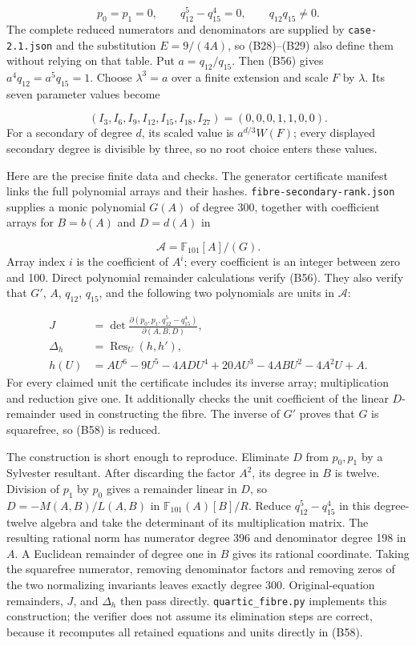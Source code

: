 \documentclass[
]{article}
\begin{document}
\[
p_0=p_1=0,\qquad q_{12}^5-q_{15}^4=0,\qquad q_{12}q_{15}\ne0.
\tag{B56}
\] The complete reduced numerators and denominators are supplied by
\texttt{case-2.1.json} and the substitution \(E=9/(4A)\), so
(B28)--(B29) also define them without relying on that table. Put
\(a=q_{12}/q_{15}\). Then (B56) gives \(a^4q_{12}=a^5q_{15}=1\). Choose
\(\lambda^3=a\) over a finite extension and scale \(F\) by \(\lambda\).
Its seven parameter values become
\protect{}\label{equation-B57}{}

\[
(I_3,I_6,I_9,I_{12},I_{15},I_{18},I_{27})=(0,0,0,1,1,0,0).
\tag{B57}
\] For a secondary of degree \(d\), its scaled value is \(a^{d/3}W(F)\);
every displayed secondary degree is divisible by three, so no root
choice enters these values.

Here are the precise finite data and checks. The generator certificate
manifest links the full polynomial arrays and their hashes.
\texttt{fibre-secondary-rank.json} supplies a monic polynomial \(G(A)\)
of degree 300, together with coefficient arrays for \(B=b(A)\) and
\(D=d(A)\) in \protect{}\label{equation-B58}{}

\[
\mathcal A=\mathbb F_{101}[A]/(G).
\tag{B58}
\] Array index \(i\) is the coefficient of \(A^i\); every coefficient is
an integer between zero and 100. Direct polynomial remainder
calculations verify (B56). They also verify that \(G'\), \(A\),
\(q_{12}\), \(q_{15}\), and the following two polynomials are units in
\(\mathcal A\): \protect{}\label{equation-B59}{}

\[
\begin{aligned}
J&=\det\frac{\partial(p_0,p_1,q_{12}^5-q_{15}^4)}{\partial(A,B,D)},\\
\Delta_h&=\operatorname{Res}_U(h,h'),\\
h(U)&=AU^6-9U^5-4ADU^4+20AU^3-4ABU^2-4A^2U+A.
\end{aligned}
\tag{B59}
\] For every claimed unit the certificate includes its inverse array;
multiplication and reduction give one. It additionally checks the unit
coefficient of the linear \(D\)-remainder used in constructing the
fibre. The inverse of \(G'\) proves that \(G\) is squarefree, so (B58)
is reduced.

The construction is short enough to reproduce. Eliminate \(D\) from
\(p_0,p_1\) by a Sylvester resultant. After discarding the factor
\(A^2\), its degree in \(B\) is twelve. Division of \(p_1\) by \(p_0\)
gives a remainder linear in \(D\), so \(D=-M(A,B)/L(A,B)\) in
\(\mathbb F_{101}(A)[B]/R\). Reduce \(q_{12}^5-q_{15}^4\) in this
degree-twelve algebra and take the determinant of its multiplication
matrix. The resulting rational norm has numerator degree 396 and
denominator degree 198 in \(A\). A Euclidean remainder of degree one in
\(B\) gives its rational coordinate. Taking the squarefree numerator,
removing denominator factors and removing zeros of the two normalizing
invariants leaves exactly degree 300. Original-equation remainders,
\(J\), and \(\Delta_h\) then pass directly. \texttt{quartic\_fibre.py}
implements this construction; the verifier does not assume its
elimination steps are correct, because it recomputes all retained
equations and units directly in (B58).
\end{document}
